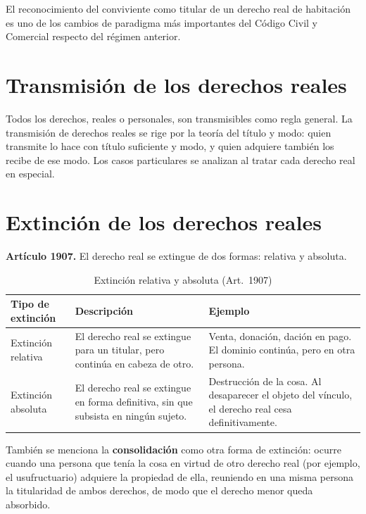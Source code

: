 \documentclass[12pt,oneside]{book}
\begin{document}
\begin{important}
El reconocimiento del conviviente como titular de un derecho real de habitación es uno de los cambios de paradigma más importantes del Código Civil y Comercial respecto del régimen anterior.
\end{important}

\section{Transmisión de los derechos reales}

Todos los derechos, reales o personales, son transmisibles como regla general. La transmisión de derechos reales se rige por la teoría del título y modo: quien transmite lo hace con título suficiente y modo, y quien adquiere también los recibe de ese modo. Los casos particulares se analizan al tratar cada derecho real en especial.

\section{Extinción de los derechos reales}

\textbf{Artículo 1907.} El derecho real se extingue de dos formas: relativa y absoluta.

\begin{table}[H]
\centering
\small
\begin{tabularx}{\textwidth}{>{\raggedright\arraybackslash}p{}>{\raggedright\arraybackslash}X>{\raggedright\arraybackslash}X}
\toprule
\textbf{Tipo de extinción} & \textbf{Descripción} & \textbf{Ejemplo} \\
\midrule
Extinción relativa &
El derecho real se extingue para un titular, pero continúa en cabeza de otro. &
Venta, donación, dación en pago. El dominio continúa, pero en otra persona. \\[0.5em]
Extinción absoluta &
El derecho real se extingue en forma definitiva, sin que subsista en ningún sujeto. &
Destrucción de la cosa. Al desaparecer el objeto del vínculo, el derecho real cesa definitivamente. \\
\bottomrule
\end{tabularx}
\caption{Extinción relativa y absoluta (Art.~1907)}
\end{table}

También se menciona la \textbf{consolidación} como otra forma de extinción: ocurre cuando una persona que tenía la cosa en virtud de otro derecho real (por ejemplo, el usufructuario) adquiere la propiedad de ella, reuniendo en una misma persona la titularidad de ambos derechos, de modo que el derecho menor queda absorbido.
\end{document}
